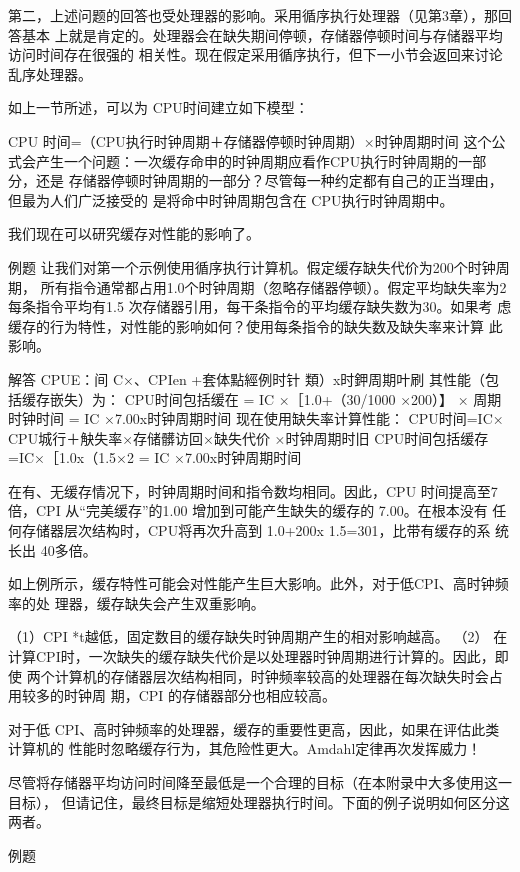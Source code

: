 第二，上述问题的回答也受处理器的影响。采用循序执行处理器（见第3章），那回答基本
上就是肯定的。处理器会在缺失期间停顿，存储器停顿时间与存储器平均访问时间存在很强的
相关性。现在假定采用循序执行，但下一小节会返回来讨论乱序处理器。

如上一节所述，可以为 CPU时间建立如下模型：

CPU 时间=（CPU执行时钟周期＋存储器停顿时钟周期）×时钟周期时间
这个公式会产生一个问题：一次缓存命申的时钟周期应看作CPU执行时钟周期的一部分，还是
存储器停顿时钟周期的一部分？尽管每一种约定都有自己的正当理由，但最为人们广泛接受的
是将命中时钟周期包含在 CPU执行时钟周期中。

我们现在可以研究缓存对性能的影响了。

例题
让我们对第一个示例使用循序执行计算机。假定缓存缺失代价为200个时钟周期，
所有指令通常都占用1.0个时钟周期（忽略存储器停顿）。假定平均缺失率为2%
每条指令平均有1.5 次存储器引用，每干条指令的平均缓存缺失数为30。如果考
虑缓存的行为特性，对性能的影响如何？使用每条指令的缺失数及缺失率来计算
此影响。

解答
CPUE：间 C×、CPIen +套体點經例时针 類）x时鉀周期叶刷
其性能（包括缓存嵌失）为：
CPU时间包括缓在 = IC ×［1.0+（30/1000 ×200）】 × 周期时钟时间
= IC ×7.00x时钟周期时间
现在使用缺失率计算性能：
CPU时间=IC×
CPU城行＋觖失率×存储髒访回×缺失代价
×时钟周期时旧
CPU时间包括缓存=IC×［1.0x（1.5×2%
= IC ×7.00x时钟周期时间

在有、无缓存情况下，时钟周期时间和指令数均相同。因此，CPU 时间提高至7
倍，CPI 从“完美缓存”的1.00 增加到可能产生缺失的缓存的 7.00。在根本没有
任何存储器层次结构时，CPU将再次升高到 1.0+200x 1.5=301，比带有缓存的系
统长出 40多倍。

如上例所示，缓存特性可能会对性能产生巨大影响。此外，对于低CPI、高时钟频率的处
理器，缓存缺失会产生双重影响。

（1）CPI *t越低，固定数目的缓存缺失时钟周期产生的相对影响越高。
（2） 在计算CPI时，一次缺失的缓存缺失代价是以处理器时钟周期进行计算的。因此，即使
两个计算机的存储器层次结构相同，时钟频率较高的处理器在每次缺失时会占用较多的时钟周
期，CPI 的存储器部分也相应较高。

对于低 CPI、高时钟频率的处理器，缓存的重要性更高，因此，如果在评估此类计算机的
性能时忽略缓存行为，其危险性更大。Amdahl定律再次发挥威力！

尽管将存储器平均访问时间降至最低是一个合理的目标（在本附录中大多使用这一目标），
但请记住，最终目标是缩短处理器执行时间。下面的例子说明如何区分这两者。

例题

